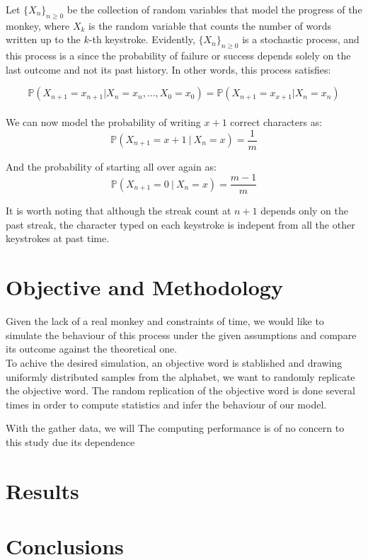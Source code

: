 \documentclass{article}
\newcommand{\SP}{\{X_n\}_{n\geq 0}}
\begin{document}
Let $\SP$ be the collection of random variables that model the progress of the monkey, where $X_k$ is the random variable that counts the number of  words written up to the $k$-th keystroke. Evidently, $\SP$ is a stochastic process, and this process is a  since the probability of failure or success depends solely on the last outcome and not its past history. In other words, this process satisfies:

\begin{equation} \label{mkv_prop}
    \mathbb{P}(X_{n+1}=x_{n+1} | X_{n}=x_{n},\ldots, X_{0}=x_{0}) = \mathbb{P}(X_{n+1}=x_{x+1} | X_{n}=x_{n})
\end{equation}\\

We can now model the probability of writing $x+1$ correct characters as:
\begin{equation}
\mathbb{P}(X_{n+1} = x+1 \ | \ X_n=x) = \frac{1}{m}
\end{equation}

And the probability of starting all over again as:
\begin{equation}
\mathbb{P}(X_{n+1} = 0 \ | \ X_n=x) = \frac{m - 1}{m}
\end{equation}

It is worth noting that although the streak count at $n+1$ depends only on the past streak, the character typed on each keystroke is indepent from all the other keystrokes at past time.

\section{Objective and Methodology}
Given the lack of a real monkey and constraints of time, we would like to simulate the behaviour of this process under the given assumptions and compare its outcome against the theoretical one.\\

To achive the desired simulation, an objective word is stablished and drawing uniformly distributed samples from the alphabet, we want to randomly replicate the objective word. The random replication of the objective word is done several times in order to compute statistics and infer the behaviour of our model.

With the gather data, we will 
The computing performance is of no concern to this study due its dependence 

\section{Results}
\section{Conclusions}
\end{document}
